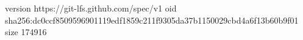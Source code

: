 version https://git-lfs.github.com/spec/v1
oid sha256:dc0ccf8509596901119edf1859c211f9305da37b1150029cbd4a6f13b60b9f01
size 174916
